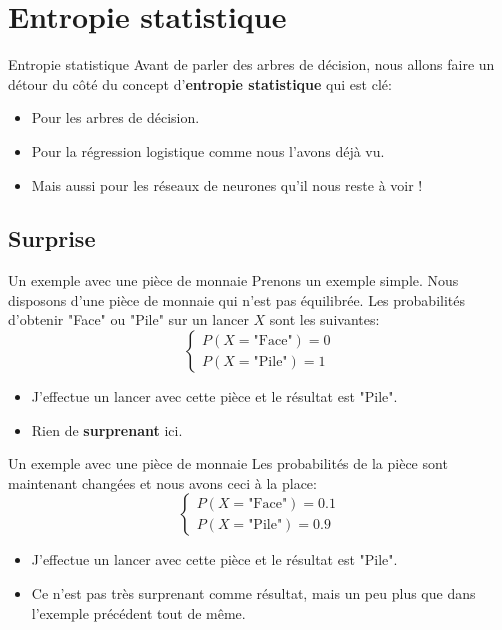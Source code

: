 \section[Entropie statistique]{Entropie statistique}

\begin{frame}{Entropie statistique}
	Avant de parler des arbres de décision, nous allons faire un détour du côté du concept d'\textbf{entropie statistique} qui est clé:
	
	\begin{itemize}
		\item Pour les arbres de décision.
		\pause
		\item Pour la régression logistique comme nous l'avons déjà vu.
		\pause
		\item Mais aussi pour les réseaux de neurones qu'il nous reste à voir !
	\end{itemize}
\end{frame}

\subsection[Surprise]{Surprise}

\begin{frame}{Un exemple avec une pièce de monnaie}
	Prenons un exemple simple. Nous disposons d'une pièce de monnaie qui n'est pas équilibrée. Les probabilités d'obtenir "Face" ou "Pile" sur un lancer $X$ sont les suivantes:
	\begin{equation*}
		\begin{cases}
			P(X = \text{"Face"}) = 0 \\
			P(X = \text{"Pile"}) = 1
		\end{cases}
	\end{equation*}
	\pause
	\begin{itemize}
		\item J'effectue un lancer avec cette pièce et le résultat est "Pile".
		\item Rien de \textbf{surprenant} ici.
	\end{itemize}
\end{frame}

\begin{frame}{Un exemple avec une pièce de monnaie}
	Les probabilités de la pièce sont maintenant changées et nous avons ceci à la place:
	\begin{equation*}
		\begin{cases}
			P(X = \text{"Face"}) = 0.1 \\
			P(X = \text{"Pile"}) = 0.9
		\end{cases}
	\end{equation*}
	\pause
	\begin{itemize}
		\item J'effectue un lancer avec cette pièce et le résultat est "Pile".
		\item Ce n'est pas très surprenant comme résultat, mais un peu plus que dans l'exemple précédent tout de même.
	\end{itemize}
\end{frame}

